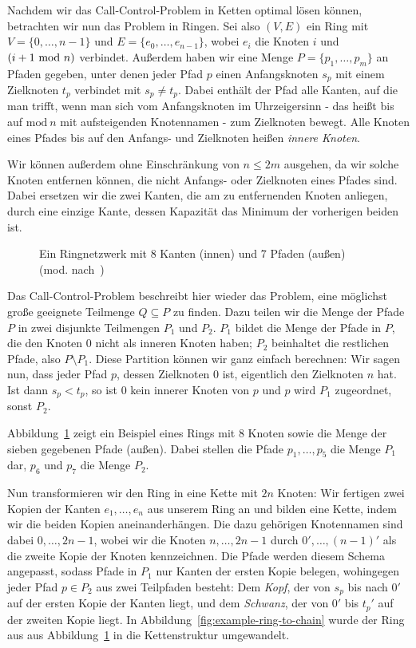 Nachdem wir das Call-Control-Problem in Ketten optimal lösen können, betrachten wir nun das Problem in Ringen.
Sei also $(V, E)$ ein Ring mit $V=\{0,\dots,n-1\}$ und $E=\{e_0, \dots, e_{n-1}\}$, wobei $e_i$ die
Knoten $i$ und $(i+1 ~\mathrm{mod}~ n)$ verbindet.
Außerdem haben wir eine Menge $P=\{p_1, \dots, p_m\}$ an Pfaden gegeben, unter denen jeder Pfad $p$ einen
Anfangsknoten $s_p$ mit einem Zielknoten $t_p$ verbindet mit $s_p \neq t_p$.
Dabei enthält der Pfad alle Kanten, auf die man trifft, wenn man sich vom Anfangsknoten im Uhrzeigersinn - das heißt
bis auf $\mathrm{mod}~n$ mit aufsteigenden Knotennamen - zum Zielknoten bewegt.
Alle Knoten eines Pfades bis auf den Anfangs- und Zielknoten heißen {\em innere Knoten}.

Wir können außerdem ohne Einschränkung von $n \leq 2m$ ausgehen, da wir solche Knoten entfernen können, die nicht
Anfangs- oder Zielknoten eines Pfades sind.
Dabei ersetzen wir die zwei Kanten, die am zu entfernenden Knoten anliegen, durch eine einzige Kante, dessen
Kapazität das Minimum der vorherigen beiden ist.

\begin{figure}[htbp]
    \centering
    \def\svgwidth{220bp}
    
    \caption{Ein Ringnetzwerk mit 8 Kanten (innen) und 7 Pfaden (außen) (mod. nach~\cite{paper})}
    \label{fig:example-ring}
\end{figure}

Das Call-Control-Problem beschreibt hier wieder das Problem, eine möglichst große geeignete Teilmenge
$Q \subseteq P$ zu finden.
Dazu teilen wir die Menge der Pfade $P$ in zwei disjunkte Teilmengen $P_1$ und $P_2$.
$P_1$ bildet die Menge der Pfade in $P$, die den Knoten $0$ nicht als inneren Knoten haben; $P_2$
beinhaltet die restlichen Pfade, also $P \setminus P_1$.
Diese Partition können wir ganz einfach berechnen:
Wir sagen nun, dass jeder Pfad $p$, dessen Zielknoten $0$ ist, eigentlich den Zielknoten $n$ hat.
Ist dann $s_p < t_p$, so ist $0$ kein innerer Knoten von $p$ und $p$ wird $P_1$ zugeordnet, sonst $P_2$.

Abbildung~\ref{fig:example-ring} zeigt ein Beispiel eines Rings mit 8 Knoten sowie die Menge der sieben gegebenen Pfade (außen).
Dabei stellen die Pfade $p_1,\dots,p_5$ die Menge $P_1$ dar, $p_6$ und $p_7$ die Menge $P_2$.


Nun transformieren wir den Ring in eine Kette mit $2n$ Knoten:
Wir fertigen zwei Kopien der Kanten $e_1,\dotsc,e_n$ aus unserem Ring an und bilden eine Kette, indem wir die
beiden Kopien aneinanderhängen.
Die dazu gehörigen Knotennamen sind dabei $0, \dotsc, 2n-1$, wobei wir die Knoten $n, \dotsc, 2n-1$ durch
$0', \dotsc, (n-1)'$ als die zweite Kopie der Knoten kennzeichnen.
Die Pfade werden diesem Schema angepasst, sodass Pfade in $P_1$ nur Kanten der ersten Kopie belegen, wohingegen
jeder Pfad $p \in P_2$ aus zwei Teilpfaden besteht: Dem {\em Kopf}, der von $s_p$ bis nach $0'$ auf der ersten
Kopie der Kanten liegt, und dem {\em Schwanz}, der von $0'$ bis $t_p '$ auf der zweiten Kopie liegt.
In Abbildung~\ref{fig:example-ring-to-chain} wurde der Ring aus aus Abbildung~\ref{fig:example-ring} in die Kettenstruktur umgewandelt.

